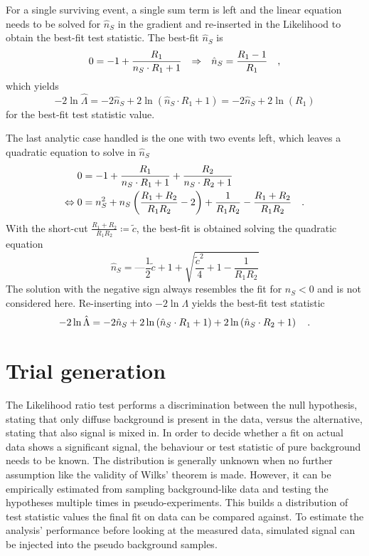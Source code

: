 For a single surviving event, a single sum term is left and the linear equation needs to be solved for $\hat{n}_S$ in the gradient and re-inserted in the Likelihood to obtain the best-fit test statistic.
The best-fit $\hat{n}_S$ is
\begin{equation}
  0 = -1 + \frac{R_1}{n_S\cdot R_1 + 1}
  \quad\text{$\Rightarrow$}\quad
  \hat{n}_S = \frac{R_1 - 1}{R_1}
  \quad\text{,}
\end{equation}
which yields
\begin{equation}
  -2\ln\hat{\Lambda}
    = -2\hat{n}_S + 2\ln\left( \hat{n}_S \cdot R_1 + 1 \right)
    = -2\hat{n}_S + 2\ln(R_1)
\end{equation}
for the best-fit test statistic value.

The last analytic case handled is the one with two events left, which leaves a quadratic equation to solve in $\hat{n}_S$
\begin{align}
  0 &= -1 + \frac{R_1}{n_S\cdot R_1 + 1} + \frac{R_2}{n_S\cdot R_2 + 1} \\
  \Leftrightarrow
  0 &= n_S^2 + n_S \left(\frac{R_1 + R_2}{R_1 R_2} - 2\right) +
       \frac{1}{R_1 R_2} - \frac{R_1 + R_2}{R_1 R_2}
  \quad\text{.}
\end{align}
With the short-cut $\frac{R_1 + R_2}{R_1 R_2} \coloneqq\tilde{c}$, the best-fit is obtained solving the quadratic equation
\begin{equation}
  \hat{n}_S = —\frac{1}{2}\tilde{c} + 1 + \sqrt{\frac{\tilde{c}^2}{4} + 1 - \frac{1}{R_1 R_2}}
\end{equation}
The solution with the negative sign always resembles the fit for $n_S < 0$ and is not considered here.
Re-inserting into $-2\ln\Lambda$ yields the best-fit test statistic
\begin{equation}
  -2\ln\hat{\Lambda}
  = -2\hat{n}_S +
      2\ln\left( \hat{n}_S \cdot R_1 + 1 \right) +
      2\ln\left( \hat{n}_S \cdot R_2 + 1 \right)
  \quad\text{.}
\end{equation}


\section{Trial generation}
The Likelihood ratio test performs a discrimination between the null hypothesis, stating that only diffuse background is present in the data, versus the alternative, stating that also signal is mixed in.
In order to decide whether a fit on actual data shows a significant signal, the behaviour or test statistic of pure background needs to be known.
The distribution is generally unknown when no further assumption like the validity of Wilks' theorem is made.
However, it can be empirically estimated from sampling background-like data and testing the hypotheses multiple times in pseudo-experiments.
This builds a distribution of test statistic values the final fit on data can be compared against.
To estimate the analysis' performance before looking at the measured data, simulated signal can be injected into the pseudo background samples.

